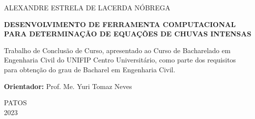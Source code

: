 \thispagestyle{empty}
	
	\begin{center}
		ALEXANDRE ESTRELA DE LACERDA NÓBREGA
	\end{center}
	
	\vspace{3.5cm}
	
	\begin{center}
		{\large \textbf{DESENVOLVIMENTO DE FERRAMENTA COMPUTACIONAL PARA DETERMINAÇÃO DE EQUAÇÕES DE CHUVAS INTENSAS}}
	\end{center}
	
	\vspace{4cm}
	
	\begin{quoting}[rightmargin=0cm,leftmargin=8cm]
 
        \noindent Trabalho de Conclusão de Curso, apresentado ao Curso de Bacharelado em Engenharia Civil do UNIFIP Centro Universitário, como parte dos requisitos para obtenção do grau de Bacharel em Engenharia Civil.
		
		\vspace{6pt}
		
		\noindent \textbf{Orientador:} Prof. Me. Yuri Tomaz Neves
		
		\vspace{6pt}
		

	\end{quoting}
	
	\vfill
	
	\begin{center}
		PATOS \\
			2023
	\end{center}
	\newpage
	
